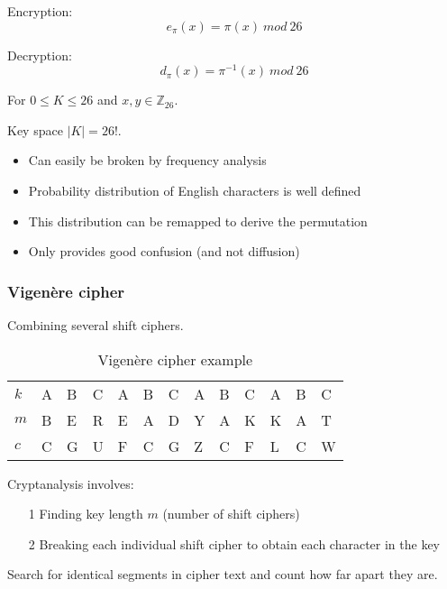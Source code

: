 \documentclass[a4paper]{article}
\begin{document}
Encryption:
\[
  e_{\pi}(x) = \pi(x) \: mod \: 26
\]

Decryption:
\[
  d_{\pi}(x) = \pi^{-1}(x) \: mod \: 26
\]

For $0 \leq K \leq 26$ and $x, y \in \mathbb{Z}_{26}$.

Key space $|K| = 26!$.


\begin{itemize}
  \item Can easily be broken by frequency analysis
  \item Probability distribution of English characters is well defined
  \item This distribution can be remapped to derive the permutation
  \item Only provides good confusion (and not diffusion)
\end{itemize}

\subsubsection{Vigen\`ere cipher}

Combining several shift ciphers.

\begin{table}[h]
  \centering
  \begin{tabular}{@{}lllllllllllll@{}}
    \toprule
    $k$ & A & B & C & A & B & C & A & B & C & A & B & C \\
    $m$ & B & E & R & E & A & D & Y & A & K & K & A & T \\
    \midrule
    $c$ & C & G & U & F & C & G & Z & C & F & L & C & W \\
    \bottomrule
  \end{tabular}
  \caption{Vigen\`ere cipher example}
  \label{tab:vigenere_cipher_example}
\end{table}
\FloatBarrier

Cryptanalysis involves:

\begin{enumerate}
  \item[1] Finding key length $m$ (number of shift ciphers)
  \item[2] Breaking each individual shift cipher to obtain each character in the
           key
\end{enumerate}


Search for identical segments in cipher text and count how far apart they are.
\end{document}
